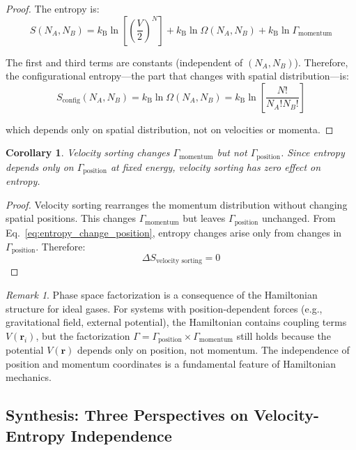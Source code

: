 \documentclass[10pt,twocolumn,letterpaper]{article}
\newtheorem{corollary}[theorem]{Corollary}
\theoremstyle{definition}
\theoremstyle{remark}
\newtheorem{remark}[theorem]{Remark}
\newcommand{\kb}{k_\text{B}}
\newcommand{\Om}{\Omega}
\begin{document}
\begin{proof}
The entropy is:
\begin{equation}
S(N_A, N_B) = \kb \ln\left[\left(\frac{V}{2}\right)^N\right] + \kb \ln \Om(N_A, N_B) + \kb \ln \Gamma_{\text{momentum}}
\end{equation}

The first and third terms are constants (independent of $(N_A, N_B)$). Therefore, the configurational entropy—the part that changes with spatial distribution—is:
\begin{equation}
S_{\text{config}}(N_A, N_B) = \kb \ln \Om(N_A, N_B) = \kb \ln\left[\frac{N!}{N_A! N_B!}\right]
\end{equation}

which depends only on spatial distribution, not on velocities or momenta.
\end{proof}

\begin{corollary}
\label{cor:velocity_sorting_ineffective}
Velocity sorting changes $\Gamma_{\text{momentum}}$ but not $\Gamma_{\text{position}}$. Since entropy depends only on $\Gamma_{\text{position}}$ at fixed energy, velocity sorting has zero effect on entropy.
\end{corollary}

\begin{proof}
Velocity sorting rearranges the momentum distribution without changing spatial positions. This changes $\Gamma_{\text{momentum}}$ but leaves $\Gamma_{\text{position}}$ unchanged. From Eq.~\eqref{eq:entropy_change_position}, entropy changes arise only from changes in $\Gamma_{\text{position}}$. Therefore:
\begin{equation}
\Delta S_{\text{velocity sorting}} = 0
\end{equation}
\end{proof}

\begin{remark}
Phase space factorization is a consequence of the Hamiltonian structure for ideal gases. For systems with position-dependent forces (e.g., gravitational field, external potential), the Hamiltonian contains coupling terms $V(\mathbf{r}_i)$, but the factorization $\Gamma = \Gamma_{\text{position}} \times \Gamma_{\text{momentum}}$ still holds because the potential $V(\mathbf{r})$ depends only on position, not momentum. The independence of position and momentum coordinates is a fundamental feature of Hamiltonian mechanics.
\end{remark}

\subsection{Synthesis: Three Perspectives on Velocity-Entropy Independence}
\end{document}
